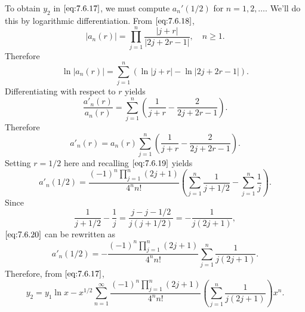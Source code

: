 \documentclass{ximera}
\begin{document}
\begin{example}
\begin{explanation}
To obtain $y_2$ in $\eqref{eq:7.6.17}$, we must compute $a_n'(1/2)$
for $n=1, 2,\dots$. We'll do this by logarithmic
differentiation.  From $\eqref{eq:7.6.18}$,
$$
|a_n(r)|=\prod_{j=1}^n\frac{|j+r|}{|2j+2r-1|},\quad n\geq 1.
$$
Therefore
$$
\ln |a_n(r)|=\sum^n_{j=1} \left(\ln |j+r|-\ln|2j+2r-1|\right).
$$
Differentiating with respect to $r$ yields
$$
\frac{a'_n(r)}{a_n(r)}=\sum^n_{j=1} \left(\frac{1}{j+r}-\frac{2}{2j+2r-1}\right).
$$
Therefore
$$
a'_n(r)=a_n(r) \sum^n_{j=1} \left(\frac{1}{j+r}-\frac{2}{2j+2r-1}\right).
$$
Setting $r=1/2$ here and recalling $\eqref{eq:7.6.19}$ yields
\begin{equation} \label{eq:7.6.20}
a'_n(1/2)=\frac{(-1)^n\prod_{j=1}^n(2j+1)}{4^nn!}\left(\sum_{j=1}^n\frac{1}{j+1/2}-\sum_{j=1}^n\frac{1}{j}\right).
\end{equation}
Since
$$
\frac{1}{j+1/2}-\frac{1}{j}=\frac{j-j-1/2}{j(j+1/2)}=-\frac{1}{j(2j+1)},
$$
$\eqref{eq:7.6.20}$ can be rewritten as
$$
a'_n(1/2)=-\frac{(-1)^n\prod_{j=1}^n(2j+1)}{4^nn!}
\sum_{j=1}^n\frac{1}{j(2j+1)}.
$$
Therefore, from $\eqref{eq:7.6.17}$,
$$
y_2=y_1\ln
x-x^{1/2}\sum_{n=1}^\infty\frac{(-1)^n\prod_{j=1}^n(2j+1)}{4^nn!}
\left(\sum_{j=1}^n\frac{1}{j(2j+1)}\right)x^n.
$$
\end{explanation}
\end{example}
\end{document}
